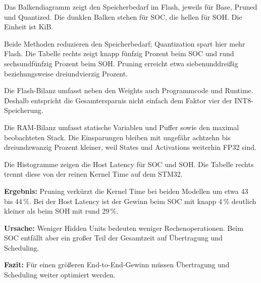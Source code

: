 \begin{sprechtext}

Das Balkendiagramm zeigt den Speicherbedarf im Flash, jeweils für Base, Pruned und Quantized. Die dunklen Balken stehen für SOC, die hellen für SOH. Die Einheit ist KiB.

Beide Methoden reduzieren den Speicherbedarf; Quantization spart hier mehr Flash. Die Tabelle rechts zeigt knapp fünfzig Prozent beim SOC und rund sechsundfünfzig Prozent beim SOH. Pruning erreicht etwa siebenunddreißig beziehungsweise dreiundvierzig Prozent.

Die Flash-Bilanz umfasst neben den Weights auch Programmcode und Runtime. Deshalb entspricht die Gesamtersparnis nicht einfach dem Faktor vier der INT8-Speicherung.

Die RAM-Bilanz umfasst statische Variablen und Puffer sowie den maximal beobachteten Stack. Die Einsparungen bleiben mit ungefähr achtzehn bis dreiundzwanzig Prozent kleiner, weil States und Activations weiterhin FP32 sind.

\end{sprechtext}


\begin{sprechtext}

Die Histogramme zeigen die Host Latency für SOC und SOH. Die Tabelle rechts trennt diese von der reinen Kernel Time auf dem STM32.

\textbf{Ergebnis:} Pruning verkürzt die Kernel Time bei beiden Modellen um etwa 43 bis 44\,\%. Bei der Host Latency ist der Gewinn beim SOC mit knapp 4\,\% deutlich kleiner als beim SOH mit rund 29\,\%.

\textbf{Ursache:} Weniger Hidden Units bedeuten weniger Rechenoperationen. Beim SOC entfällt aber ein großer Teil der Gesamtzeit auf Übertragung und Scheduling.

\textbf{Fazit:} Für einen größeren End-to-End-Gewinn müssen Übertragung und Scheduling weiter optimiert werden.

\end{sprechtext}


